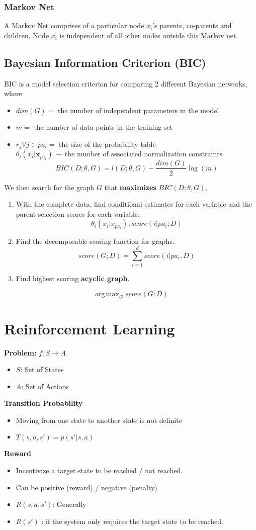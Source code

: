 \documentclass[a4paper]{article}
\DeclareMathOperator*{\argmax}{arg\,max}
\begin{document}
\subsubsection{Markov Net}
A Markov Net comprises of a particular node $x_i$'s parents, co-parents and children. Node $x_i$ is independent of all other nodes outside this Markov net.

\subsection{Bayesian Information Criterion (BIC)}
BIC is a model selection criterion for comparing 2 different Bayesian networks, where
\begin{itemize}
	\item $dim(G) =$ the number of independent parameters in the model
	\item $m =$ the number of data points in the training set
	\item $r_j \forall j\in pa_i =$ the size of the probability table $\theta_i(x_i|\textbf{x}_{pa_i})\ -\ \text{the number of associated normalization constraints}$ $$ BIC(D;\theta,G) = l(D;\theta,G) - \frac{dim(G)}{2} \log(m) $$
\end{itemize}
\noindent We then search for the graph $G$ that \textbf{maximizes} $BIC(D;\theta,G)$.
\begin{enumerate}
	\item With the complete data, find conditional estimates for each variable and the parent selection scores for each variable. $$\theta_i(x_i|x_{pa_i}) , score(i|pa_i;D)$$
	\item Find the decomposable scoring function for graphs. $$ score(G;D) = \sum_{i=1}^d score(i|pa_i,D) $$
	\item Find highest scoring \textbf{acyclic graph}.
\end{enumerate}
$$\argmax_G score(G;D) $$
\newpage
\section{Reinforcement Learning}
\noindent \textbf{Problem:} $f: S \rightarrow A$
\begin{itemize}
	\item $S$: Set of States
	\item $A$: Set of Actions
\end{itemize}
\noindent \textbf{Transition Probability}
\begin{itemize}
	\item Moving from one state to another state is not definite
	\item $T(s,a,s') = p(s'|s,a)$
\end{itemize}
\noindent \textbf{Reward}
\begin{itemize}
	\item Incentivize a target state to be reached / not reached.
	\item Can be positive (reward) / negative (penalty)
	\item $R(s,a,s')$: Generally
	\item $R(s')$ : if the system only requires the target state to be reached.
\end{itemize}
\end{document}
